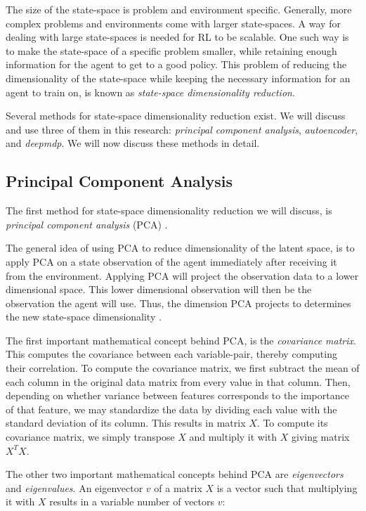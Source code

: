 The size of the state-space is problem and environment specific. Generally, more complex problems and environments come with larger state-spaces. A way for dealing with large state-spaces is needed for RL to be scalable. One such way is to make the state-space of a specific problem smaller, while retaining enough information for the agent to get to a good policy. This problem of reducing the dimensionality of the state-space while keeping the necessary information for an agent to train on, is known as \emph{state-space dimensionality reduction}.  %

Several methods for state-space dimensionality reduction exist. We will discuss and use three of them in this research: \emph{principal component analysis}, \emph{autoencoder}, and \emph{deepmdp}. We will now discuss these methods in detail. %
\subsection{Principal Component Analysis}\label{pl-pca}
The first method for state-space dimensionality reduction we will discuss, is \emph{principal component analysis} (PCA) \cite{pca}. 

The general idea of using PCA to reduce dimensionality of the latent space, is to apply PCA on a state observation of the agent immediately after receiving it from the environment. Applying PCA will project the observation data to a lower dimensional space. This lower dimensional observation will then be the observation the agent will use. Thus, the dimension PCA projects to determines the new state-space dimensionality \cite{mario}.

The first important mathematical concept behind PCA, is the \emph{covariance matrix}. This computes the covariance between each variable-pair, thereby computing their correlation. To compute the covariance matrix, we first subtract the mean of each column in the original data matrix from every value in that column. Then, depending on whether variance between features corresponds to the importance of that feature, we may standardize the data by dividing each value with the standard deviation of its column. This results in matrix $X$. To compute its covariance matrix, we simply transpose $X$ and multiply it with $X$ giving matrix $X^TX$.

The other two important mathematical concepts behind PCA are \emph{eigenvectors} and \emph{eigenvalues}. An eigenvector $v$ of a matrix $X$ is a vector such that multiplying it with $X$ results in a variable number of vectors $v$:


